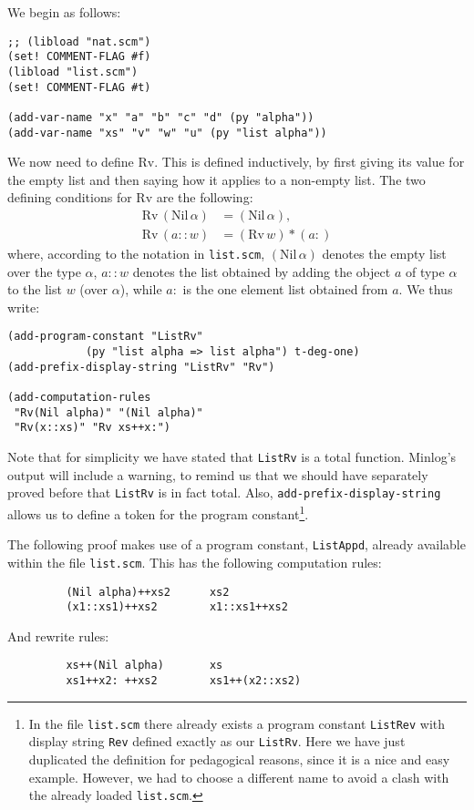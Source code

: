 \documentclass[12pt]{amsart}
\newcommand{\nil}{\mathrm{Nil}}
\newcommand{\listappend}{\mathbin{\ast}}
\newcommand{\listrev}{\mathrm{Rv}}
\newcommand{\mi}{Minlog}
\begin{document}
We begin as follows:
\begin{verbatim}
;; (libload "nat.scm")
(set! COMMENT-FLAG #f)
(libload "list.scm")
(set! COMMENT-FLAG #t)

(add-var-name "x" "a" "b" "c" "d" (py "alpha"))
(add-var-name "xs" "v" "w" "u" (py "list alpha"))
\end{verbatim}

We now need to define $\listrev$.  This is defined inductively, by
first giving its value for the empty list and then saying how it
applies to a non-empty list.  The two defining conditions for
$\listrev$ are the following:
\begin{align*}
\listrev\,(\nil\, \alpha) &= (\nil\, \alpha),
\\
\listrev\,(a::w) &= (\listrev\, w) \listappend (a{:})
\end{align*}
where, according to the notation in \texttt{list.scm}, $(\nil\, \alpha)$
denotes the empty list over the type $\alpha$, $a::w$ denotes the list
obtained by adding the object $a$ of type $\alpha$ to the list $w$
(over $\alpha$), while $a{:}$ is the one element list obtained from
$a$.  We thus write:
\begin{verbatim}
(add-program-constant "ListRv"
            (py "list alpha => list alpha") t-deg-one)
(add-prefix-display-string "ListRv" "Rv")

(add-computation-rules
 "Rv(Nil alpha)" "(Nil alpha)"
 "Rv(x::xs)" "Rv xs++x:")
\end{verbatim}

Note that for simplicity we have stated that \texttt{ListRv} is a
total function.  \mi's output will include a warning, to remind us
that we should have separately proved before that \texttt{ListRv} is
in fact total.  Also, \texttt{add-prefix-display-string} allows us to
define a token for the program constant\footnote{In the file
  \texttt{list.scm} there already exists a program constant
  \texttt{ListRev} with display string \texttt{Rev} defined exactly as
  our \texttt{ListRv}.  Here we have just duplicated the definition
  for pedagogical reasons, since it is a nice and easy example.
  However, we had to choose a different name to avoid a clash with the
  already loaded \texttt{list.scm}.}.

The following proof makes use of a program constant,
\texttt{ListAppd}, already available within the file
\texttt{list.scm}.  This has the following computation rules:
\begin{verbatim}
         (Nil alpha)++xs2      xs2
         (x1::xs1)++xs2        x1::xs1++xs2
\end{verbatim}
And rewrite rules:
\begin{verbatim}
         xs++(Nil alpha)       xs
         xs1++x2: ++xs2        xs1++(x2::xs2)
\end{verbatim}
\end{document}
